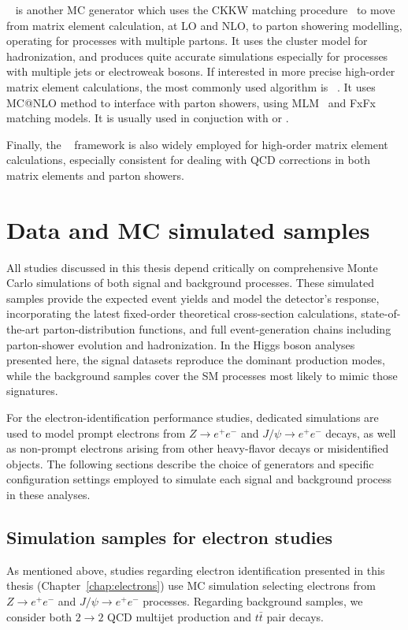 \sherpa~\cite{Bothmann_2019} is another MC generator which uses the CKKW matching procedure~\cite{Lavesson_2008} to move from matrix element calculation, at LO and NLO, to parton showering modelling, operating for processes with multiple partons. It uses the cluster model for hadronization, and produces quite accurate simulations especially for processes with multiple jets or electroweak bosons. 
If interested in more precise high-order matrix element calculations, the most commonly used algorithm is \madgraph~\cite{Alwall_2014}. It uses \textsc{MC@NLO} method to interface with parton showers, using MLM~\cite{MANGANO2002343} and FxFx~\cite{Frederix_2012} matching models. It is usually used in conjuction with \pythia or \herwig.

Finally, the \powhegbox~\cite{Frixione_2007} framework is also widely employed for high-order matrix element calculations, especially consistent for dealing with QCD corrections in both matrix elements and parton showers.

\section{Data and MC simulated samples}
\label{sec:mc_samples}

All studies discussed in this thesis depend critically on comprehensive Monte Carlo simulations of both signal and background processes. These simulated samples provide the expected event yields and model the detector’s response, incorporating the latest fixed-order 
theoretical cross-section calculations, state-of-the-art parton-distribution functions, and full event-generation chains including parton-shower evolution and hadronization. In the Higgs boson analyses presented here, the signal datasets reproduce the dominant production modes, while the background samples cover the SM processes most likely to mimic those signatures.

For the electron-identification performance studies, dedicated simulations are used to model prompt electrons from $Z \rightarrow e^{+}e^{-} $ and $J/\psi \rightarrow e^{+}e^{-}$ decays, as well as non-prompt electrons arising from other heavy-flavor decays or misidentified objects. The following sections describe the choice of generators and specific configuration settings employed
to simulate each signal and background process in these analyses.

\subsection{Simulation samples for electron studies}
\label{subsec:electron_mc}
As mentioned above, studies regarding electron identification presented in this thesis (Chapter~\ref{chap:electrons}) use MC simulation selecting electrons from $Z \rightarrow e^{+}e^{-} $ and $J/\psi \rightarrow e^{+}e^{-}$ processes.
Regarding background samples, we consider both $2 \to 2$ QCD multijet production and $t\bar{t}$ pair decays.

